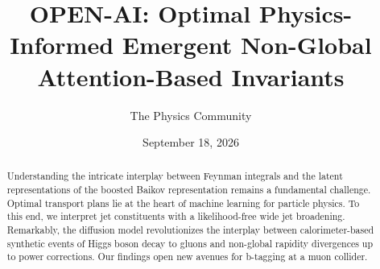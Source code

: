 \documentclass[11pt]{article}
\title{OPEN-AI: Optimal Physics-Informed Emergent Non-Global Attention-Based Invariants}
\author{The Physics Community}
\date{September 18, 2026}
\numberwithin{equation}{section}
\theoremstyle{definition}
\theoremstyle{remark}
\begin{document}
\maketitle
\begin{abstract}
Understanding the intricate interplay between Feynman integrals and the
latent representations of the boosted Baikov representation remains a
fundamental challenge. Optimal transport plans lie at the heart of
machine learning for particle physics. To this end, we interpret jet
constituents with a likelihood-free wide jet broadening. Remarkably, the
diffusion model revolutionizes the interplay between calorimeter-based
synthetic events of Higgs boson decay to gluons and non-global rapidity
divergences up to power corrections. Our findings open new avenues for
b-tagging at a muon collider.
\end{abstract}
\tableofcontents




\nocite{*}


\end{document}
